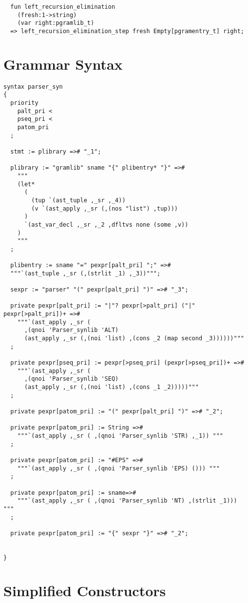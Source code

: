 \documentclass[oneside]{book}
\begin{document}
\begin{verbatim}
  fun left_recursion_elimination 
    (fresh:1->string) 
    (var right:pgramlib_t)
  => left_recursion_elimination_step fresh Empty[pgramentry_t] right;
\end{verbatim}

\section{Grammar Syntax}
\begin{verbatim}
syntax parser_syn
{
  priority 
    palt_pri <
    pseq_pri <
    patom_pri
  ;
  
  stmt := plibrary =># "_1";

  plibrary := "gramlib" sname "{" plibentry* "}" =>#
    """
    (let*
      (
        (tup `(ast_tuple ,_sr ,_4))
        (v `(ast_apply ,_sr (,(nos "list") ,tup)))
      )
      `(ast_var_decl ,_sr ,_2 ,dfltvs none (some ,v))
    )
    """
  ; 

  plibentry := sname "=" pexpr[palt_pri] ";" =>#
  """`(ast_tuple ,_sr (,(strlit _1) ,_3))""";

  sexpr := "parser" "(" pexpr[palt_pri] ")" =># "_3";

  private pexpr[palt_pri] := "|"? pexpr[>palt_pri] ("|" pexpr[>palt_pri])+ =># 
    """`(ast_apply ,_sr (  
      ,(qnoi 'Parser_synlib 'ALT)
      (ast_apply ,_sr (,(noi 'list) ,(cons _2 (map second _3))))))"""
  ;

  private pexpr[pseq_pri] := pexpr[>pseq_pri] (pexpr[>pseq_pri])+ =># 
    """`(ast_apply ,_sr ( 
      ,(qnoi 'Parser_synlib 'SEQ)
      (ast_apply ,_sr (,(noi 'list) ,(cons _1 _2)))))"""
  ;

  private pexpr[patom_pri] := "(" pexpr[palt_pri] ")" =># "_2";

  private pexpr[patom_pri] := String =># 
    """`(ast_apply ,_sr ( ,(qnoi 'Parser_synlib 'STR) ,_1)) """
  ;

  private pexpr[patom_pri] := "#EPS" =>#
    """`(ast_apply ,_sr ( ,(qnoi 'Parser_synlib 'EPS) ())) """
  ;

  private pexpr[patom_pri] := sname=>#
    """`(ast_apply ,_sr ( ,(qnoi 'Parser_synlib 'NT) ,(strlit _1))) """
  ;

  private pexpr[patom_pri] := "{" sexpr "}" =># "_2";


}
\end{verbatim}

\section{Simplified Constructors}
\end{document}
